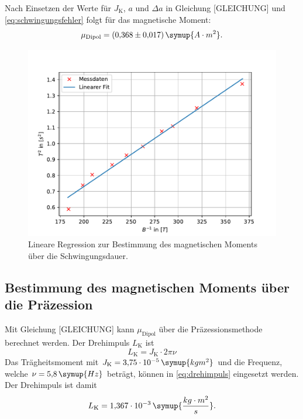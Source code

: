 Nach Einsetzen der Werte für $J_{\text{K}}$, $a$ und $\Delta a$ in Gleichung [GLEICHUNG] und \eqref{eq:schwingungsfehler}
folgt für das magnetische Moment:
\begin{equation*}
\mu_{\text{Dipol}} = (0{,}368 \pm 0{,}017)\, \symup{A \cdot m^2}.
\end{equation*}

\begin{figure}[h!]
\centering
\includegraphics[scale=.9]{SchwingungsMethode.pdf}
\caption{Lineare Regression zur Bestimmung des magnetischen Moments über die Schwingungsdauer.}
\label{fig:bildschwingung}
\end{figure}



\subsection{Bestimmung des magnetischen Moments über die Präzession}
Mit Gleichung [GLEICHUNG] kann $\mu_{\text{Dipol}}$ über die Präzessionsmethode berechnet werden. Der Drehimpuls $L_{\text{K}}$ ist
\begin{equation}
L_{\text{K}} = J_{\text{K}} \cdot 2\pi \nu
\label{eq:drehimpuls}
\end{equation}
Das Trägheitsmoment mit $J_{\text{K}} = 3{,}75 \cdot 10^{-5} \, \symup{kgm^2}$ und die Frequenz, welche $\nu = 5{,}8\, \symup{Hz}$ 
beträgt, können in \eqref{eq:drehimpuls} eingesetzt werden. Der Drehimpuls ist damit
\begin{equation*}
L_{\text{K}} = 1{,}367\cdot 10^{-3}\, \symup{\frac{kg\cdot m^2}{s}}.
\end{equation*}


